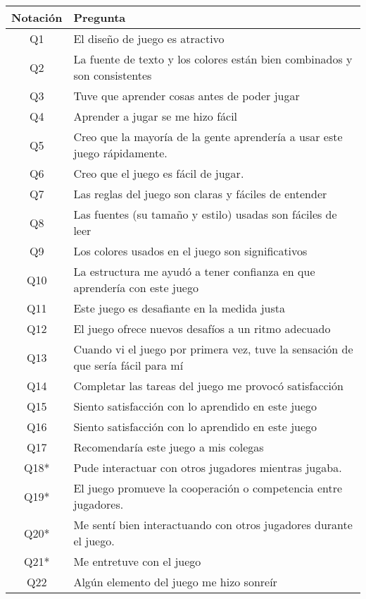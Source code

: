 \begin{table}[h]
\begin{tabular}{|c|l|} %
\hline %
\textbf{Notación} & \textbf{Pregunta} \\\hline %
Q1       & El diseño de juego es atractivo \\ 
Q2       & La fuente de texto y los colores están bien combinados y son consistentes \\
Q3       & Tuve que aprender cosas antes de poder jugar \\
Q4       & Aprender a jugar se me hizo fácil \\
Q5       & Creo que la mayoría de la gente aprendería a usar este juego rápidamente. \\
Q6       & Creo que el juego es fácil de jugar. \\
Q7       & Las reglas del juego son claras y fáciles de entender \\
Q8       & Las fuentes (su tamaño y estilo) usadas son fáciles de leer \\
Q9       & Los colores usados en el juego son significativos \\
Q10      & La estructura me ayudó a tener confianza en que aprendería con este juego \\
Q11      & Este juego es desafiante en la medida justa \\
Q12      & El juego ofrece nuevos desafíos a un ritmo adecuado \\
Q13      & Cuando vi el juego por primera vez, tuve la sensación de que sería fácil para mí \\
Q14      & Completar las tareas del juego me provocó satisfacción \\
Q15      & Siento satisfacción con lo aprendido en este juego \\
Q16      & Siento satisfacción con lo aprendido en este juego \\
Q17      & Recomendaría este juego a mis colegas \\
Q18*     & Pude interactuar con otros jugadores mientras jugaba. \\
Q19*     & El juego promueve la cooperación o competencia entre jugadores. \\
Q20*     & Me sentí bien interactuando con otros jugadores durante el juego. \\
Q21*     & Me entretuve con el juego \\
Q22      & Algún elemento del juego me hizo sonreír \\

\end{tabular}
\end{table}
